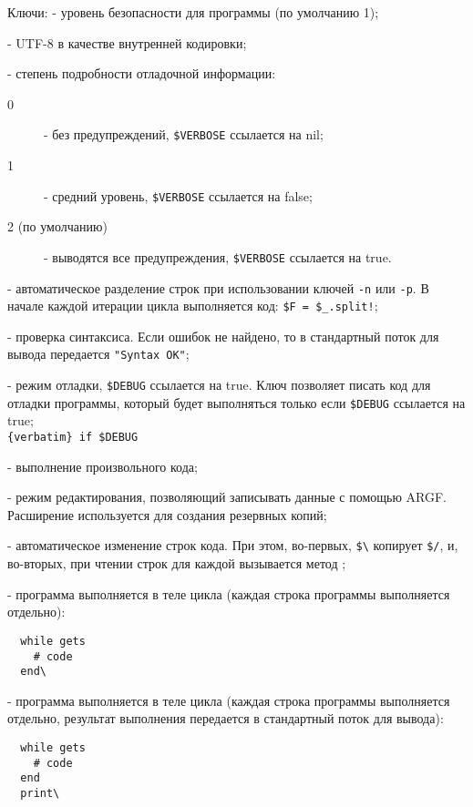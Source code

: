 \begin{keylist}{Ключи:}
   - уровень безопасности для программы (по умолчанию 1);
  
   - UTF-8 в качестве внутренней кодировки;

   - степень подробности отладочной информации:
  \begin{description}
    \item[0] - без предупреждений, \verb!$VERBOSE! ссылается на nil;
    \item[1] - средний уровень, \verb!$VERBOSE! ссылается на false;
    \item[2 (по умолчанию)] - выводятся все предупреждения, \verb!$VERBOSE! ссылается на true.
  \end{description}    
  
   - автоматическое разделение строк при использовании ключей \verb!-n! или \verb!-p!. В начале каждой итерации цикла выполняется код: \verb/$F = $_.split!/;

  - проверка синтаксиса. Если ошибок не найдено, то в стандартный поток для вывода передается \verb!"Syntax OK"!; 

   - режим отладки, \verb!$DEBUG! ссылается на true. Ключ позволяет писать код для отладки программы, который будет выполняться только если \verb!$DEBUG! ссылается на true;
  \\\verb!{verbatim} if $DEBUG! 
  
   - выполнение произвольного кода;

   - режим редактирования, позволяющий записывать данные с помощью ARGF. Расширение используется для создания резервных копий; 

   - автоматическое изменение строк кода. При этом, во-первых, \verb!$\! копирует \verb!$/!, и, во-вторых, при чтении строк для каждой вызывается метод ;

   - программа выполняется в теле цикла (каждая строка программы выполняется отдельно):  
  \begin{verbatim}
  while gets 
    # code 
  end\
  \end{verbatim}    
  
   - программа выполняется в теле цикла (каждая строка программы выполняется отдельно, результат выполнения передается в стандартный поток для вывода):  
  \begin{verbatim}
  while gets 
    # code 
  end
  print\
  \end{verbatim}
  

\end{keylist}
